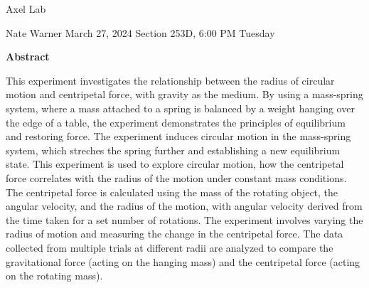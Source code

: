 \documentclass{report}
\title{\Huge{}}
\author{\huge{Nathan Warner}}
\date{\huge{}}
\begin{document}
    \begin{center}
        \begin{Huge}
            Axel Lab
        \end{Huge}
        \begin{Large}
            \bigbreak \noindent 
            Nate Warner
            \smallbreak \noindent
            March 27, 2024
            \bigbreak \noindent 
            Section 253D, 6:00 PM Tuesday 
        \end{Large}
    \end{center}
    \pagebreak 
    \tableofcontents
    \pagebreak \bigbreak \noindent 
    \begin{center}
    \textbf{Abstract}
    \end{center}
    \begin{adjustwidth}{.3in}{.3in}
        \hspace{\parindent} This experiment investigates the relationship between the radius of circular motion and centripetal force, with gravity as the medium. By using a mass-spring system, where a mass attached to a spring is balanced by a weight hanging over the edge of a table, the experiment demonstrates the principles of equilibrium and restoring force. The experiment induces circular motion in the mass-spring system, which streches the spring further and establishing a new equilibrium state. This experiment is used to explore circular motion, how the centripetal force correlates with the radius of the motion under constant mass conditions. The centripetal force is calculated using the mass of the rotating object, the angular velocity, and the radius of the motion, with angular velocity derived from the time taken for a set number of rotations. The experiment involves varying the radius of motion and measuring the change in the centripetal force. The data collected from multiple trials at different radii are analyzed to compare the gravitational force (acting on the hanging mass) and the centripetal force (acting on the rotating mass).
    \end{adjustwidth}
\end{document}
